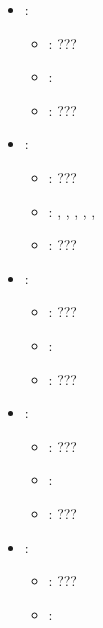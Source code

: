 \begin{itemize}
\begin{itemize}
           \end{itemize}
    \item {}:
           \begin{itemize}
                \item \optionPossibleValues{}: ???
                \item \optionDefaultValue{}: 
                \item \optionDescrption{}: ???
           \end{itemize}
    \item {}:
           \begin{itemize}
                \item \optionPossibleValues{}: ???
                \item \optionDefaultValue{}: \optionDefaultValueStyle{[0.5}, , , , , \optionDefaultValueStyle{0.99]}
                \item \optionDescrption{}: ???
           \end{itemize}
    \item {}:
           \begin{itemize}
                \item \optionPossibleValues{}: ???
                \item \optionDefaultValue{}: 
                \item \optionDescrption{}: ???
           \end{itemize}
    \item {}:
           \begin{itemize}
                \item \optionPossibleValues{}: ???
                \item \optionDefaultValue{}: 
                \item \optionDescrption{}: ???
           \end{itemize}
    \item {}:
           \begin{itemize}
                \item \optionPossibleValues{}: ???
                \item \optionDefaultValue{}: 

\end{itemize}
\end{itemize}
